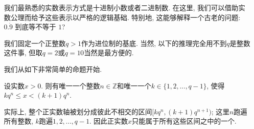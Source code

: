

我们最熟悉的实数表示方式是十进制小数或者二进制数. 在这里, 我们可以借助实数公理而给予这些表示以严格的逻辑基础. 特别地, 这能够解释一个古老的问题: $0.\dot{9}$ 到底等不等于 $1$?

我们固定一个正整数$q>1$作为进位制的基底. 当然, 以下的推理完全用不到$q$是整数这件事, 但取$q=2$或$q=10$当然是最方便的.

我们从如下非常简单的命题开始. 
\begin{lemma}{}
设实数$x>0$. 则有唯一一个整数$n\in\mathbb{Z}$和唯一一个$k\in\{1,2,...,q-1\}$, 使得$kq^n\leq x<(k+1)q^{n}$.
\end{lemma}

实际上, 整个正实数轴被划分成彼此不相交的区间$[kq^n,(k+1)q^{n+1})$; 这里$n$跑遍所有整数, $k$跑遍$1,2,...,q-1$. 因此正实数$x$只能属于所有这些区间之中的一个. 